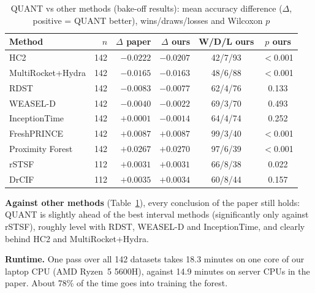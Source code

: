 \documentclass[conference]{IEEEtran}
\begin{document}
\begin{table}[t]
\caption{QUANT vs other methods (bake-off results): mean accuracy difference ($\Delta$, positive = QUANT better), wins/draws/losses and Wilcoxon $p$}
\label{tab:mcm}
\centering
\setlength{\tabcolsep}{4pt}
\begin{tabular}{@{}lrrrcc@{}}
\toprule
Method & $n$ & $\Delta$ paper & $\Delta$ ours & W/D/L ours & $p$ ours \\
\midrule
HC2 & 142 & $-0.0222$ & $-0.0207$ & 42/7/93 & $<$0.001 \\
MultiRocket+Hydra & 142 & $-0.0165$ & $-0.0163$ & 48/6/88 & $<$0.001 \\
RDST~\cite{rdst} & 142 & $-0.0083$ & $-0.0077$ & 62/4/76 & 0.133 \\
WEASEL-D~\cite{weasel2} & 142 & $-0.0040$ & $-0.0022$ & 69/3/70 & 0.493 \\
InceptionTime~\cite{inceptiontime} & 142 & $+0.0001$ & $-0.0014$ & 64/4/74 & 0.252 \\
FreshPRINCE~\cite{freshprince} & 142 & $+0.0087$ & $+0.0087$ & 99/3/40 & $<$0.001 \\
Proximity Forest~\cite{pf} & 142 & $+0.0267$ & $+0.0270$ & 97/6/39 & $<$0.001 \\
\midrule
rSTSF & 112 & $+0.0031$ & $+0.0031$ & 66/8/38 & 0.022 \\
DrCIF & 112 & $+0.0035$ & $+0.0034$ & 60/8/44 & 0.157 \\
\bottomrule
\end{tabular}
\end{table}

\textbf{Against other methods} (Table~\ref{tab:mcm}), every conclusion of the paper still holds: QUANT is slightly ahead of the best interval methods (significantly only against rSTSF), roughly level with RDST, WEASEL-D and InceptionTime, and clearly behind HC2 and MultiRocket+Hydra.

\textbf{Runtime.} One pass over all 142 datasets takes 18.3 minutes on one core of our laptop CPU (AMD Ryzen~5 5600H), against 14.9 minutes on server CPUs in the paper. About 78\% of the time goes into training the forest.
\end{document}
